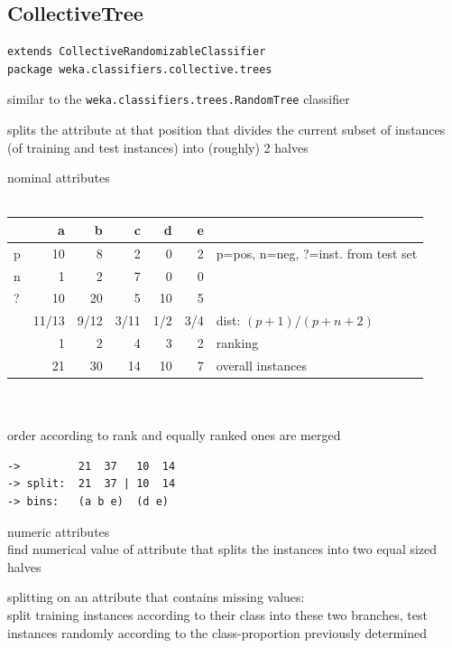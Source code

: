 \documentclass[a4paper]{book}
\begin{document}
\subsection{CollectiveTree}
\begin{verbatim}
extends CollectiveRandomizableClassifier 
package weka.classifiers.collective.trees
\end{verbatim}

\begin{tight_itemize}
	\item similar to the \texttt{weka.classifiers.trees.RandomTree} classifier
	\item splits the attribute at that position that divides the current subset 
	of instances (of training and test instances) into (roughly) 2 halves
	\begin{tight_enumerate}
		\item nominal attributes \\
		\\
		{\scriptsize
		\begin{tabular}{l | r | r | r | r | r | l }
			  &  a &  b &  c &  d &  e & \\
			\hline
			p & 10 &  8 &  2 &  0 &  2 & p=pos, n=neg, ?=inst. from test set \\
			n &  1 &  2 &  7 &  0 &  0 & \\
			? & 10 & 20 &  5 & 10 &  5 & \\
			\hline
			  & 11/13 & 9/12 & 3/11 & 1/2 & 3/4 & dist: $(p+1)/(p+n+2)$ \\
			  &  1 &  2 &  4 &  3 &  2 & ranking \\
			  & 21 & 30 & 14 & 10 &  7 & overall instances \\
			\hline
		\end{tabular}
		} \\
		\\
		order according to rank and equally ranked ones are merged
		{\scriptsize
		\begin{verbatim}
->         21  37   10  14
-> split:  21  37 | 10  14
-> bins:   (a b e)  (d e)
		\end{verbatim}
		}

		\item numeric attributes \\
		find numerical value of attribute that splits the instances into 
		two equal sized halves

		\item splitting on an attribute that contains missing values: \\
		split training instances according to their class into these two 
		branches, test instances randomly according to the class-proportion 
		previously determined
	\end{tight_enumerate}


\end{tight_itemize}
\end{document}
